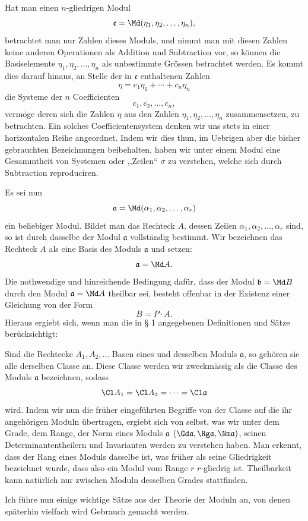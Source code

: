 Hat man einen $n$-gliedrigen Modul
\[
 \mathfrak e=\Md(\eta_1,\eta_2,\ldots,\eta_n),
\]
betrachtet man nur Zahlen dieses Moduls, und nimmt man mit diesen Zahlen keine anderen Operationen als Addition und Subtraction vor, so können die Basiselemente $\eta_1,\eta_2,\ldots,\eta_n$ als unbestimmte Grössen betrachtet werden. Es kommt dies darauf hinaus, an Stelle der in $\mathfrak e$ enthaltenen Zahlen
\[
 \eta=c_1\eta_1+\cdots+c_n\eta_n
\]
die Systeme der $n$ Coefficienten
\[
 c_1,c_2,\ldots,c_n,
\]
vermöge deren sich die Zahlen $\eta$ aus den Zahlen $\eta_1,\eta_2,\ldots,\eta_n$ zusammensetzen, zu betrachten. Ein solches Coefficientensystem denken wir uns stets in einer horizontalen Reihe angeordnet. Indem wir dies thun, im Uebrigen aber die bisher gebrauchten Bezeichnungen beibehalten, haben wir unter einem Modul eine Gesammtheit von Systemen oder ,,Zeilen`` $\sigma$ zu verstehen, welche sich durch Subtraction reproduciren.

Es sei nun
\[
 \mathfrak a=\Md(\alpha_1,\alpha_2,\ldots,\alpha_r)
\]
ein beliebiger Modul. Bildet man das Rechteck $A$, dessen Zeilen $\alpha_1,\alpha_2,\ldots,\alpha_r$ sind, so ist durch dasselbe der Modul $\mathfrak a$ vollständig bestimmt. Wir bezeichnen das Rechteck $A$ als eine Basis des Moduls $\mathfrak a$ und setzen:
\[
 \mathfrak a=\Md A.
\]
Die nothwendige und hinreichende Bedingung dafür, dass der Modul $\mathfrak b=\Md B$ durch den Modul $\mathfrak a=\Md A$ theilbar sei, besteht offenbar in der Existenz einer Gleichung von der Form
\[
 B=P\cdot A.
\]
Hieraus ergiebt sich, wenn man die in § 1 angegebenen Definitionen und Sätze berücksichtigt:

Sind die Rechtecke $A_1,A_2,\ldots$ Basen eines und desselben Moduls $\mathfrak a$, so gehören sie alle derselben Classe an. Diese Classe werden wir zweckmässig als die Classe des Moduls $\mathfrak a$ bezeichnen, sodass
\[
 \Cl A_1=\Cl A_2=\cdots=\Cl\mathfrak a
\]
wird. Indem wir nun die früher eingeführten Begriffe von der Classe auf die ihr angehörigen Moduln übertragen, ergiebt sich von selbst, was wir unter dem Grade, dem Range, der Norm eines Moduls $\mathfrak a$ $(\Gd\mathfrak a,\Rg\mathfrak a,\Nm\mathfrak a)$, seinen Determinantentheilern und Invarianten werden zu verstehen haben. Man erkennt, dass der Rang eines Moduls dasselbe ist, was früher als seine Gliedrigkeit bezeichnet wurde, dass also ein Modul vom Range $r$ $r$-gliedrig ist. Theilbarkeit kann natürlich nur zwischen Moduln desselben Grades stattfinden.

Ich führe nun einige wichtige Sätze aus der Theorie der Moduln an, von denen späterhin vielfach wird Gebrauch gemacht werden.

